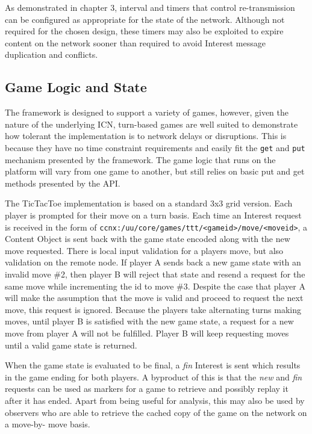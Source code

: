 \documentclass[a4paper,12pt]{report}      %
\begin{document}
As demonstrated in chapter 3, interval and timers that control re-transmission can be configured as
appropriate for the state of the network. Although not required for the chosen design, these timers may
also be exploited to expire content on the network sooner than required to avoid Interest message
duplication and conflicts.

\subsection{Game Logic and State}

The framework is designed to support a variety of games, however, given the nature of the underlying
ICN, turn-based games are well suited to demonstrate how tolerant the implementation is
to network delays or disruptions. This is because they have no time constraint requirements and easily fit the
\verb!get! and \verb!put! mechanism presented by the framework. The game logic that runs on the platform will vary
 from one game to another, but still relies on basic put and get methods presented by the API.

The TicTacToe implementation is based on a standard 3x3 grid version. Each player is prompted for
their move on a turn basis. Each time an Interest request is received in the form of
\verb!ccnx:/uu/core/games/ttt/<gameid>/move/<moveid>!, a Content Object is sent back with the game state
encoded along with the new move requested. There is local input validation for a players move, but
also validation on the remote node. If player A sends back a new game state with an invalid move \#2,
then player B will reject that state and resend a request for the same move while incrementing the id to move \#3. 
Despite the case that player A will make the assumption that the move is valid and proceed to request the next move, 
this request is ignored. Because the players take alternating turns making moves, until player B is satisfied with the new game state, a
request for a new move from player A will not be fulfilled. Player B will keep requesting moves until a
valid game state is returned.

When the game state is evaluated to be final, a \emph{fin} Interest is sent which results in the game ending for
both players. A byproduct of this is that the \emph{new} and \emph{fin} requests can be used as markers for a game to
retrieve and possibly replay it after it has ended. Apart from being useful for analysis, this may also be
used by observers who are able to retrieve the cached copy of the game on the network on a move-by-
move basis.
\end{document}
